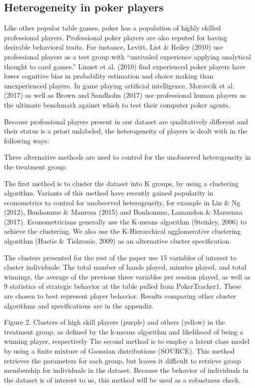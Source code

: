 \documentclass[12pt]{article}
\begin{document}
\subsection{Heterogeneity in poker players} \label{sec:heterogeneity}

Like other popular table games, poker has a population of highly skilled professional players. Professional poker players are also reputed for having desirable behavioral traits. For instance, Levitt, List \& Reiley (2010) use professional players as a test group with “unrivaled experience applying analytical thought to card games.” Linnet et al. (2010) find experienced poker players have lower cognitive bias in probability estimation and choice making than unexperienced players. In game playing artificial intelligence, Moravcik et al. (2017) as well as Brown and Sandholm (2017) use professional human players as the ultimate benchmark against which to test their computer poker agents.

Because professional players present in our dataset are qualitatively different and their status is a priori unlabeled, the heterogeneity of players is dealt with in the following ways:

Three alternative methods are used to control for the unobserved heterogeneity in the treatment group:

The first method is to cluster the dataset into K groups, by using a clustering algorithm. Variants of this method have recently gained popularity in econometrics to control for unobserved heterogeneity, for example in Lin \& Ng (2012), Bonhomme \& Manresa (2015) and Bonhomme, Lamandon \& Marsenna (2017). Econometricians generally use the K-means algorithm (Steinley, 2006) to achieve the clustering. We also use the K-Hierarchical agglomerative clustering algorithm (Hastie \& Tishranie, 2009) as an alternative cluster specification.

The clusters presented for the rest of the paper use 15 variables of interest to cluster individuals: The total number of hands played, minutes played, and total winnings, the average of the previous three variables per session played, as well as 9 statistics of strategic behavior at the table pulled from PokerTracker1. These are chosen to best represent player behavior. Results comparing other cluster algorithms and specifications are in the appendix.

Figure 2. Clusters of high skill players (purple) and others (yellow) in the treatment group, as defined by the k-means algorithm and likelihood of being a winning player, respectively
The second method is to employ a latent class model by using a finite mixture of Gaussian distributions (SOURCE). This method retrieves the parameters for each group, but leaves it difficult to retrieve group membership for individuals in the dataset. Because the behavior of individuals in the dataset is of interest to us, this method will be used as a robustness check.
\end{document}
